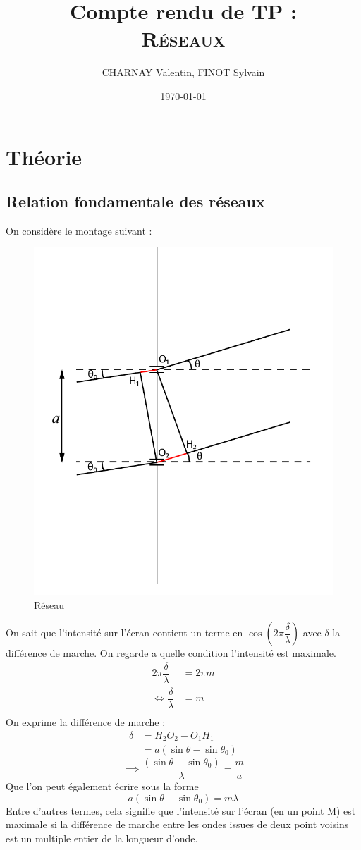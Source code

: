 \documentclass[12pt,a4paper]{article}
\author{CHARNAY Valentin, FINOT Sylvain}
\title{Compte rendu de TP :\\ \scshape Réseaux}
\date{\today}
\begin{document}
\maketitle
\section{Théorie}
\subsection{Relation fondamentale des réseaux}
On considère le montage suivant : 
\begin{figure}[h]
	\centering
	\includegraphics[scale=1, trim=0 3cm 0 2.5cm,clip]{"res/Schema Young"}
	\caption[]{Réseau}
	\label{fig:schema-young}
\end{figure}
On sait que l'intensité sur l'écran contient un terme en $\cos(2\pi\dfrac{\delta}{\lambda})$ avec $\delta$ la différence de marche. On regarde a quelle condition l'intensité est maximale.\\
\begin{align*}
	2\pi\dfrac{\delta}{\lambda}	&=	2\pi m \\[1em]
	\iff\dfrac{\delta}{\lambda}		&=	m\\
\end{align*}
On exprime la différence de marche :
\begin{align*}
	 \delta &=	H_2O_2-O_1H_1\\
   			&=	a(\sin\theta-\sin \theta_0)
\end{align*}
$$\implies \dfrac{(\sin\theta-\sin \theta_0)}{\lambda}		=	\dfrac{m}{a}$$
Que l'on peut également écrire sous la forme
$$a(\sin\theta-\sin \theta_0)=m\lambda$$
Entre d'autres termes, cela signifie que l'intensité sur l'écran (en un point M) est maximale si la différence de marche entre les ondes issues de deux point voisins est un multiple entier de la longueur d'onde.
\end{document}
